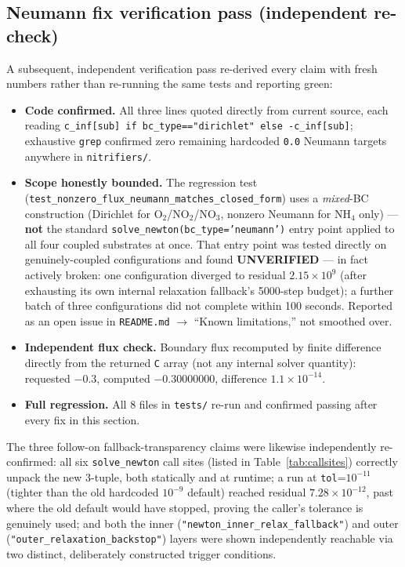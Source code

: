 \documentclass[11pt]{article}
\newcommand{\unverified}{\textcolor{red!60!black}{\textbf{UNVERIFIED}}}
\newcommand{\code}[1]{\texttt{#1}}
\newcommand{\test}[1]{\texttt{\small #1}}
\begin{document}
\subsection{Neumann fix verification pass (independent re-check)}
\label{sec:neumann-fix-verify}
A subsequent, independent verification pass re-derived every claim with fresh
numbers rather than re-running the same tests and reporting green:
\begin{itemize}
\item \textbf{Code confirmed.} All three lines quoted directly from current
source, each reading \code{c\_inf[sub] if bc\_type=="dirichlet" else
-c\_inf[sub]}; exhaustive \code{grep} confirmed zero remaining hardcoded
\code{0.0} Neumann targets anywhere in \code{nitrifiers/}.
\item \textbf{Scope honestly bounded.} The regression test
(\test{test\_nonzero\_flux\_neumann\_matches\_closed\_form}) uses a
\emph{mixed}-BC construction (Dirichlet for O$_2$/NO$_2$/NO$_3$, nonzero
Neumann for NH$_4$ only) --- \textbf{not} the standard
\code{solve\_newton(bc\_type='neumann')} entry point applied to all four
coupled substrates at once. That entry point was tested directly on
genuinely-coupled configurations and found \unverified{} --- in fact actively
broken: one configuration diverged to residual $2.15\times10^9$ (after
exhausting its own internal relaxation fallback's 5000-step budget); a further
batch of three configurations did not complete within 100 seconds. Reported
as an open issue in \code{README.md} $\rightarrow$ ``Known limitations,'' not
smoothed over.
\item \textbf{Independent flux check.} Boundary flux recomputed by finite
difference directly from the returned \code{C} array (not any internal
solver quantity): requested $-0.3$, computed $-0.30000000$, difference
$1.1\times10^{-14}$.
\item \textbf{Full regression.} All 8 files in \code{tests/} re-run and
confirmed passing after every fix in this section.
\end{itemize}
The three follow-on fallback-transparency claims were likewise independently
re-confirmed: all six \code{solve\_newton} call sites (listed in
Table~\ref{tab:callsites}) correctly unpack the new 3-tuple, both statically
and at runtime; a run at \code{tol}=$10^{-11}$ (tighter than the old
hardcoded $10^{-9}$ default) reached residual $7.28\times10^{-12}$, past
where the old default would have stopped, proving the caller's tolerance is
genuinely used; and both the inner (\code{"newton\_inner\_relax\_fallback"})
and outer (\code{"outer\_relaxation\_backstop"}) layers were shown
independently reachable via two distinct, deliberately constructed trigger
conditions.
\end{document}
